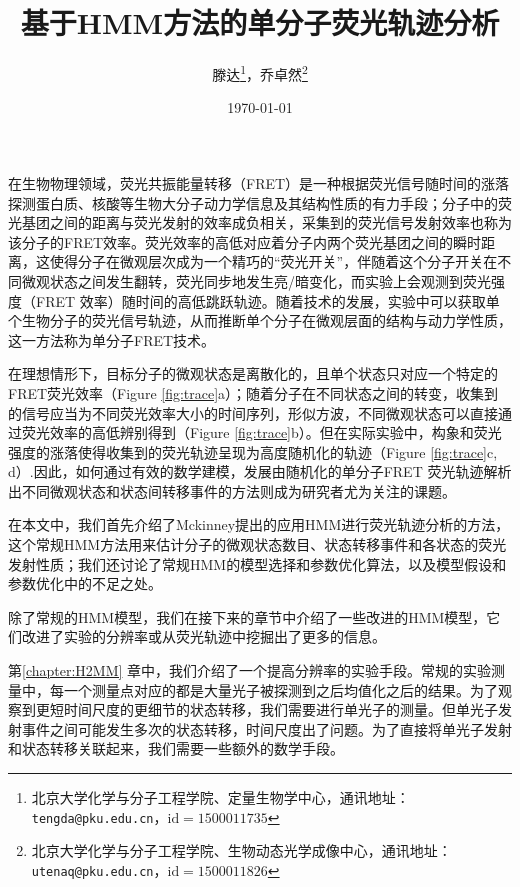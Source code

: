 \documentclass[11pt, a4paper]{article}
\begin{document}
\title{基于HMM方法的单分子荧光轨迹分析}
\author{滕达\footnote{北京大学化学与分子工程学院、定量生物学中心，通讯地址：\texttt{tengda@pku.edu.cn}，$\mathrm{id}=1500011735$}，乔卓然\footnote{北京大学化学与分子工程学院、生物动态光学成像中心，通讯地址：\texttt{utenaq@pku.edu.cn}，$\mathrm{id}=1500011826$}}
\date{\today}

\maketitle

在生物物理领域，荧光共振能量转移（FRET）是一种根据荧光信号随时间的涨落探测蛋白质、核酸等生物大分子动力学信息及其结构性质的有力手段；分子中的荧光基团之间的距离与荧光发射的效率成负相关，采集到的荧光信号发射效率也称为该分子的FRET效率。荧光效率的高低对应着分子内两个荧光基团之间的瞬时距离，这使得分子在微观层次成为一个精巧的“荧光开关”，伴随着这个分子开关在不同微观状态之间发生翻转，荧光同步地发生亮/暗变化，而实验上会观测到荧光强度（FRET 效率）随时间的高低跳跃轨迹。随着技术的发展，实验中可以获取单个生物分子的荧光信号轨迹，从而推断单个分子在微观层面的结构与动力学性质，这一方法称为单分子FRET技术。


在理想情形下，目标分子的微观状态是离散化的，且单个状态只对应一个特定的FRET荧光效率（Figure \ref{fig:trace}a）；随着分子在不同状态之间的转变，收集到的信号应当为不同荧光效率大小的时间序列，形似方波，不同微观状态可以直接通过荧光效率的高低辨别得到（Figure \ref{fig:trace}b）。但在实际实验中，构象和荧光强度的涨落使得收集到的荧光轨迹呈现为高度随机化的轨迹（Figure \ref{fig:trace}c, d）.因此，如何通过有效的数学建模，发展由随机化的单分子FRET 荧光轨迹解析出不同微观状态和状态间转移事件的方法则成为研究者尤为关注的课题。


在本文中，我们首先介绍了Mckinney提出的应用HMM进行荧光轨迹分析的方法，这个常规HMM方法用来估计分子的微观状态数目、状态转移事件和各状态的荧光发射性质；我们还讨论了常规HMM的模型选择和参数优化算法，以及模型假设和参数优化中的不足之处。

除了常规的HMM模型，我们在接下来的章节中介绍了一些改进的HMM模型，它们改进了实验的分辨率或从荧光轨迹中挖掘出了更多的信息。

第\ref{chapter:H2MM} 章中，我们介绍了一个提高分辨率的实验手段。常规的实验测量中，每一个测量点对应的都是大量光子被探测到之后均值化之后的结果。为了观察到更短时间尺度的更细节的状态转移，我们需要进行单光子的测量。但单光子发射事件之间可能发生多次的状态转移，时间尺度出了问题。为了直接将单光子发射和状态转移关联起来，我们需要一些额外的数学手段。
\end{document}

